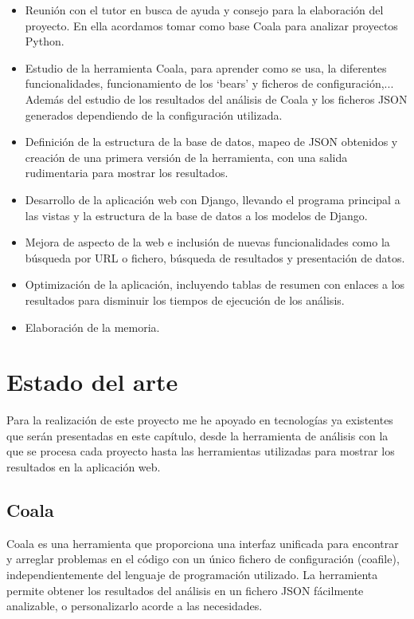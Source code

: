 \documentclass[a4paper, 12pt]{book}
\begin{document}
\begin{itemize}
  \item Reunión con el tutor en busca de ayuda y consejo para la elaboración del proyecto. En ella acordamos tomar como base Coala para analizar proyectos Python.
  \item Estudio de la herramienta Coala, para aprender como se usa, la diferentes funcionalidades, funcionamiento de los `bears' y ficheros de configuración,... Además del estudio de los resultados del análisis de Coala y los ficheros JSON generados dependiendo de la configuración utilizada.
  \item Definición de la estructura de la base de datos, mapeo de JSON obtenidos y creación de una primera versión de la herramienta, con una salida rudimentaria para mostrar los resultados.
  \item Desarrollo de la aplicación web con Django, llevando el programa principal a las vistas y la estructura de la base de datos a los modelos de Django.
  \item Mejora de aspecto de la web e inclusión de nuevas funcionalidades como la búsqueda por URL o fichero, búsqueda de resultados y presentación de datos.
  \item Optimización de la aplicación, incluyendo tablas de resumen con enlaces a los resultados para disminuir los tiempos de ejecución de los análisis.
  \item Elaboración de la memoria.
\end{itemize}



\cleardoublepage
\chapter{Estado del arte}
Para la realización de este proyecto me he apoyado en tecnologías ya existentes que serán presentadas en este capítulo, desde la herramienta de análisis con la que se procesa cada proyecto hasta las herramientas utilizadas para mostrar los resultados en la aplicación web.

\section{Coala} 
\label{sec:seccion1}
Coala es una herramienta que proporciona una interfaz unificada para encontrar y arreglar problemas en el código con un único fichero de configuración (coafile), independientemente del lenguaje de programación utilizado. La herramienta permite obtener los resultados del análisis en un fichero JSON fácilmente analizable, o personalizarlo acorde a las necesidades.~\cite{coala:_coala}
\end{document}
